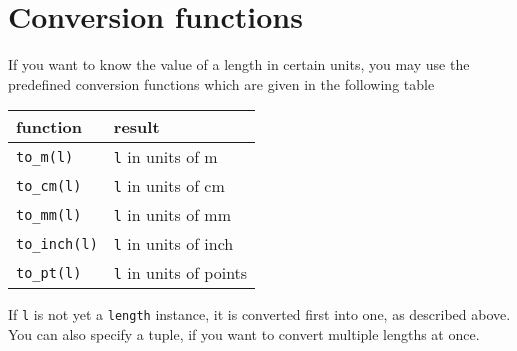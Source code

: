 \section{Conversion functions}
If you want to know the value of a \PyX{} length in certain units, you
may use the predefined conversion functions which are given in the
following table
\begin{center}
\begin{tabular}{ll}
function & result \\
\hline
\texttt{to\_m(l)} & \texttt{l} in units of m\\
\texttt{to\_cm(l)} & \texttt{l} in units of cm\\
\texttt{to\_mm(l)} & \texttt{l} in units of mm\\
\texttt{to\_inch(l)} & \texttt{l} in units of inch\\
\texttt{to\_pt(l)} & \texttt{l} in units of points\\
\end{tabular}
\end{center}
If \verb|l| is not yet a \verb|length| instance, it is converted first
into one, as described above. You can also specify a tuple, if you
want to convert multiple lengths at once.







